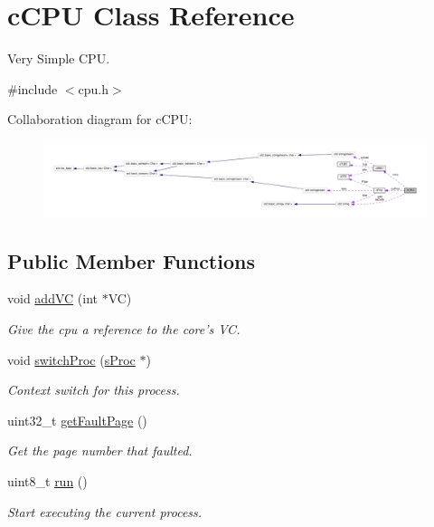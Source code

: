 \hypertarget{classcCPU}{\section{c\-C\-P\-U \-Class \-Reference}
\label{d2/dc6/classcCPU}
}


\-Very \-Simple \-C\-P\-U.  




{\ttfamily \#include $<$cpu.\-h$>$}



\-Collaboration diagram for c\-C\-P\-U\-:
\nopagebreak
\begin{figure}[H]
\begin{center}
\leavevmode
\includegraphics[width=350pt]{d9/d80/classcCPU__coll__graph}
\end{center}
\end{figure}
\subsection*{\-Public \-Member \-Functions}
\begin{DoxyCompactItemize}
\item 
void \hyperlink{classcCPU_a2a76a12433bce75b45c7b0f5b1eb9e0c}{add\-V\-C} (int $\ast$\-V\-C)
\begin{DoxyCompactList}\small\item\em \-Give the cpu a reference to the core's \-V\-C. \end{DoxyCompactList}\item 
void \hyperlink{classcCPU_abbc235250416bd5bcba0630617988bb4}{switch\-Proc} (\hyperlink{structsProc}{s\-Proc} $\ast$)
\begin{DoxyCompactList}\small\item\em \-Context switch for this process. \end{DoxyCompactList}\item 
uint32\-\_\-t \hyperlink{classcCPU_a37f4ab4a93668da37be34f8d4d77a339}{get\-Fault\-Page} ()
\begin{DoxyCompactList}\small\item\em \-Get the page number that faulted. \end{DoxyCompactList}\item 
uint8\-\_\-t \hyperlink{classcCPU_a68467fbd50317a9495765606d2f7d4b1}{run} ()
\begin{DoxyCompactList}\small\item\em \-Start executing the current process. \end{DoxyCompactList}\end{DoxyCompactItemize}
